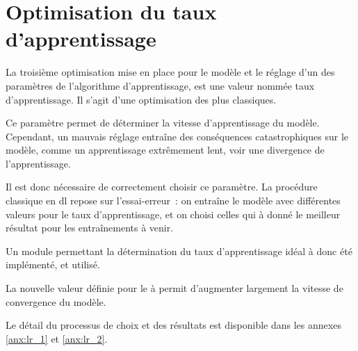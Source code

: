 \section{Optimisation du taux d'apprentissage}\label{lr_opti_papud}
La troisième optimisation mise en place pour le modèle et le réglage d'un des paramètres de l'algorithme d'apprentissage, est une valeur nommée \og taux d'apprentissage\fg{}. Il s'agit d'une optimisation des plus classiques\autocite{LearningRateOptimisation}.

Ce paramètre permet de déterminer la vitesse d'apprentissage du modèle.
Cependant, un mauvais réglage entraîne des conséquences catastrophiques sur le modèle, comme un apprentissage extrêmement lent, voir une divergence de l'apprentissage.

Il est donc nécessaire de correctement choisir ce paramètre.
La procédure classique en \gls{dl} repose sur l'essai-erreur~: on entraîne le modèle avec différentes valeurs pour le taux d'apprentissage, et on choisi celles qui à donné le meilleur résultat pour les entraînements à venir.

Un module permettant la détermination du taux d'apprentissage idéal à donc été implémenté, et utilisé.

La nouvelle valeur définie pour le à permit d'augmenter largement la vitesse de convergence du modèle. %

Le détail du processus de choix et des résultats est disponible dans les annexes \ref{anx:lr_1} et \ref{anx:lr_2}.
